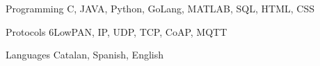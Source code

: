 


\begin{cvskills}


\cvskill
{Programming} %
{C, JAVA, Python, GoLang, MATLAB, SQL, HTML, CSS} %


\cvskill
{Protocols} %
{6LowPAN, IP, UDP, TCP, CoAP, MQTT} %


\cvskill
{Languages} %
{Catalan, Spanish, English} %


\end{cvskills}